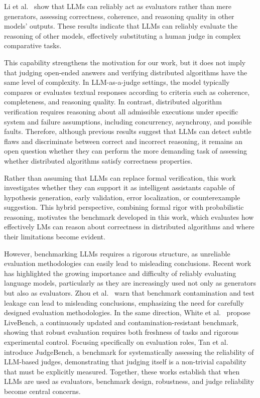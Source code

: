 Li et al.~\cite{li2025generation} show that LLMs can reliably act as evaluators rather than mere generators, assessing correctness, coherence, and reasoning quality in other models’ outputs. These results indicate that LLMs can reliably evaluate the reasoning of other models, effectively substituting a human judge in complex comparative tasks.

This capability strengthens the motivation for our work, but it does not imply that judging open-ended answers and verifying distributed algorithms have the same level of complexity. In LLM-as-a-judge settings, the model typically compares or evaluates textual responses according to criteria such as coherence, completeness, and reasoning quality. In contrast, distributed algorithm verification requires reasoning about all admissible executions under specific system and failure assumptions, including concurrency, asynchrony, and possible faults. Therefore, although previous results suggest that LLMs can detect subtle flaws and discriminate between correct and incorrect reasoning, it remains an open question whether they can perform the more demanding task of assessing whether distributed algorithms satisfy correctness properties.

Rather than assuming that LLMs can replace formal verification, this work investigates whether they can support it as intelligent assistants capable of hypothesis generation, early validation, error localization, or counterexample suggestion. This hybrid perspective, combining formal rigor with probabilistic reasoning, motivates the benchmark developed in this work, which evaluates how effectively LMs can reason about correctness in distributed algorithms and where their limitations become evident.

However, benchmarking LLMs requires a rigorous structure, as unreliable evaluation methodologies can easily lead to misleading conclusions. Recent work has highlighted the growing importance and difficulty of reliably evaluating language models, particularly as they are increasingly used not only as generators but also as evaluators. Zhou et al.~\cite{zhou2023don} warn that benchmark contamination and test leakage can lead to misleading conclusions, emphasizing the need for carefully designed evaluation methodologies. In the same direction, White et al.~\cite{white2024livebench} propose LiveBench, a continuously updated and contamination-resistant benchmark, showing that robust evaluation requires both freshness of tasks and rigorous experimental control. Focusing specifically on evaluation roles, Tan et al.~\cite{tan2024judgebench} introduce JudgeBench, a benchmark for systematically assessing the reliability of LLM-based judges, demonstrating that judging itself is a non-trivial capability that must be explicitly measured. Together, these works establish that when LLMs are used as evaluators, benchmark design, robustness, and judge reliability become central concerns.

